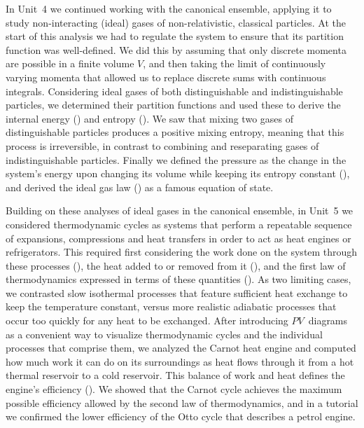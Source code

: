 In Unit~4 we continued working with the canonical ensemble, applying it to study non-interacting (ideal) gases of non-relativistic, classical particles.
At the start of this analysis we had to regulate the system to ensure that its partition function was well-defined.
We did this by assuming that only discrete momenta are possible in a finite volume $V$, and then taking the limit of continuously varying momenta that allowed us to replace discrete sums with continuous integrals.
Considering ideal gases of both distinguishable and indistinguishable particles, we determined their partition functions and used these to derive the internal energy () and entropy ().
We saw that mixing two gases of distinguishable particles produces a positive mixing entropy, meaning that this process is irreversible, in contrast to combining and reseparating gases of indistinguishable particles.
Finally we defined the pressure as the change in the system's energy upon changing its volume while keeping its entropy constant (), and derived the ideal gas law () as a famous equation of state.

Building on these analyses of ideal gases in the canonical ensemble, in Unit~5 we considered thermodynamic cycles as systems that perform a repeatable sequence of expansions, compressions and heat transfers in order to act as heat engines or refrigerators.
This required first considering the work done on the system through these processes (), the heat added to or removed from it (), and the first law of thermodynamics expressed in terms of these quantities ().
As two limiting cases, we contrasted slow isothermal processes that feature sufficient heat exchange to keep the temperature constant, versus more realistic adiabatic processes that occur too quickly for any heat to be exchanged.
After introducing $PV$~diagrams as a convenient way to visualize thermodynamic cycles and the individual processes that comprise them, we analyzed the Carnot heat engine and computed how much work it can do on its surroundings as heat flows through it from a hot thermal reservoir to a cold reservoir.
This balance of work and heat defines the engine's efficiency ().
We showed that the Carnot cycle achieves the maximum possible efficiency allowed by the second law of thermodynamics, and in a tutorial we confirmed the lower efficiency of the Otto cycle that describes a petrol engine.

